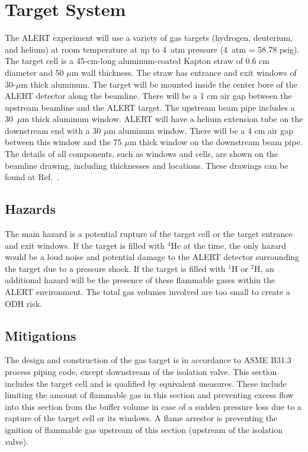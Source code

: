 \section{Target System}

The ALERT experiment will use a variety of gas targets (hydrogen, deuterium, and helium) at
room temperature at up to 4~atm pressure (4~atm = 58.78 psig). The target cell is a
45-cm-long aluminum-coated Kapton straw of 0.6 cm diameter and 50 $\mu$m wall thickness. The
straw has entrance and exit windows of 30-$\mu$m thick aluminum. The target will be mounted
inside the center bore of the ALERT detector along the beamline. There will be a 1 cm air gap
between the upstream beamline and the ALERT target. The upstream beam pipe includes a 30~$\mu$m
thick aluminum window. ALERT will have a helium extension tube on the downstream end with a
30 $\mu$m aluminum window. There will be a 4 cm air gap between this window and the 75 $\mu$m
thick window on the downstream beam pipe. The details of all components, such as windows and cells,
are shown on the beamline drawing, including thicknesses and locations. These drawings can be found
at Ref.~\cite{engineering-page}.

\subsection{Hazards} 

The main hazard is a potential rupture of the target cell or the target entrance and exit windows.
If the target is filled with $^4$He at the time, the only hazard would be a loud noise and potential
damage to the ALERT detector surrounding the target due to a pressure shock. If the target is filled
with $^1$H or $^2$H, an additional hazard will be the presence of these flammable gases within the
ALERT environment. The total gas volumes involved are too small to create a ODH risk.

\subsection{Mitigations}

The design and construction of the gas target is in accordance to ASME B31.3 process piping code, except
downstream of the isolation valve. This section includes the target cell and is qualified by equivalent
measures. These include limiting the amount of flammable gas in this section and preventing excess flow
into this section from the buffer volume in case of a sudden pressure loss due to a rapture of the target
cell or its windows. A flame arrestor is preventing the ignition of flammable gas upstream of this section
(upstream of the isolation valve).

